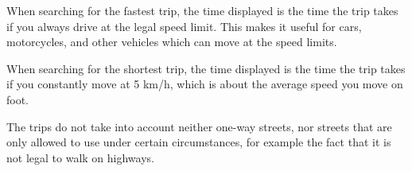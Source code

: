 When searching for the fastest trip, the time displayed is the time the trip takes if you always drive at the legal speed limit. This makes it useful for cars, motorcycles, and other vehicles which can move at the speed limits.

When searching for the shortest trip, the time displayed is the time the trip takes if you constantly move at 5 km/h, which is about the average speed you move on foot.

The trips do not take into account neither one-way streets, nor streets that are only allowed to use under certain circumstances, for example the fact that it is not legal to walk on highways.
